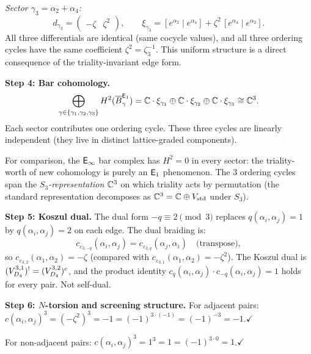 \begin{computation}[\texorpdfstring{$D_4$}{D_4} at the Coxeter root: \texorpdfstring{$N = 3$}{N = 3}, triality]
\emph{Sector $\gamma_3 = \alpha_2 + \alpha_4$:}
\[
d_{\gamma_3}
= \begin{pmatrix} -\zeta & \zeta^2 \end{pmatrix},
\qquad
\xi_{\gamma_3}
= [e^{\alpha_2} \mid e^{\alpha_4}]
  + \zeta^2\,[e^{\alpha_4} \mid e^{\alpha_2}].
\]
All three differentials are identical (same cocycle values), and all
three ordering cycles have the same coefficient
$\zeta^2 = \zeta_3^{-1}$.  This uniform structure is a direct
consequence of the triality-invariant edge form.
\smallskip

\noindent\textbf{Step 4: Bar cohomology.}
\[
\bigoplus_{\gamma \in \{\gamma_1,\gamma_2,\gamma_3\}}
H^2(\overline{B}^{\mathsf{E}_1}_\gamma)
= \mathbb{C} \cdot \xi_{\gamma_1}
  \oplus \mathbb{C} \cdot \xi_{\gamma_2}
  \oplus \mathbb{C} \cdot \xi_{\gamma_3}
\cong \mathbb{C}^3.
\]
Each sector contributes one ordering cycle.  These three cycles are
linearly independent (they live in distinct lattice-graded components).

For comparison, the $\mathsf{E}_{\infty}$ bar complex has $H^2 = 0$ in every
sector: the triality-worth of new cohomology is purely an $\mathsf{E}_1$
phenomenon.  The 3 ordering cycles span the
\emph{$S_3$-representation} $\mathbb{C}^3$ on which triality acts by
permutation (the standard representation decomposes as
$\mathbb{C}^3 = \mathbb{C} \oplus V_{\mathrm{std}}$ under $S_3$).
\smallskip

\noindent\textbf{Step 5: Koszul dual.}
The dual form $-q \equiv 2 \pmod{3}$ replaces $q(\alpha_i,\alpha_j) = 1$
by $q(\alpha_i,\alpha_j) = 2$ on each edge.  The dual braiding is:
\[
c_{\varepsilon_{3,-q}}(\alpha_i,\alpha_j) = c_{\varepsilon_{3,q}}(\alpha_j,\alpha_i)
\quad\text{(transpose)},
\]
so
$c_{\varepsilon_{3,2}}(\alpha_1,\alpha_2) = -\zeta$
(compared with $c_{\varepsilon_{3,1}}(\alpha_1,\alpha_2) = -\zeta^2$).
The Koszul dual is $(V_{D_4}^{3,1})^! = (V_{D_4}^{3,2})^c$,
and the product identity
$c_q(\alpha_i,\alpha_j) \cdot c_{-q}(\alpha_i,\alpha_j) = 1$
holds for every pair.  Not self-dual.
\smallskip

\noindent\textbf{Step 6: $N$-torsion and screening structure.}
For adjacent pairs: $c(\alpha_i,\alpha_j)^3 = (-\zeta^2)^3 = -1
= (-1)^{3 \cdot (-1)} = (-1)^{-3} = -1$.\;$\checkmark$

For non-adjacent pairs: $c(\alpha_i,\alpha_j)^3 = 1^3 = 1
= (-1)^{3 \cdot 0} = 1$.\;$\checkmark$


\end{computation}
